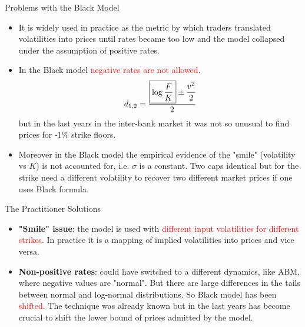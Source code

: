 \documentclass{beamer}
\begin{document}
\begin{frame}{Problems with the Black Model}
\begin{itemize}
	\item It is widely used in practice as the metric by which traders translated volatilities into prices until rates became too low and the model collapsed under the assumption of positive rates.
	\item In the Black model \textcolor{red}{negative rates are not allowed}.
	\begin{equation*}
		d_{1,2} = \frac{\boxed{\log{\frac{F}{K}}} \pm \cfrac{v^2}{2}}{2} 
	\end{equation*}
	but in the last years in the inter-bank market it was not so unusual to find prices for -1\% strike floors.
	\item Moreover in the Black model the empirical evidence of the "smile" (volatility vs $K$) is not accounted for, i.e. $\sigma$ is a constant. Two caps identical but for the strike need a different volatility to recover two different market prices if one uses Black formula.
\end{itemize}
\end{frame}

\begin{frame}{The Practitioner Solutions}
\begin{itemize}
	\item \textbf{"Smile" issue}: the model is used with \textcolor{red}{different input volatilities for different strikes}. In practice it is a mapping of implied volatilities into prices and vice versa.
	\item \textbf{Non-positive rates}: could have switched to a different dynamics, like ABM, where negative values are "normal". But there are large differences in the tails between normal and log-normal distributions.
	So Black model has been \textcolor{red}{shifted}. The technique was already known but in the last years has become crucial to shift the lower bound of prices admitted by the model.
\end{itemize}
\end{frame}
\end{document}
